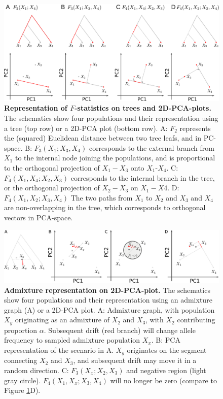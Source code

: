 \documentclass[12pt,fullpage, a4paper]{article}
\begin{document}
\begin{figure}[!ht]
	\includegraphics[width=\textwidth]{figures/fstats_pca_vs_tree.pdf}
	\caption{\textbf{Representation of $F$-statistics on trees and 2D-PCA-plots.} The schematics show four populations and their representation using a tree (top row) or a 2D-PCA plot (bottom row). A: $F_2$ represents the (squared) Euclidean distance between two tree leafs, and in PC-space. B: $F_3(X_1; X_3, X_4)$ corresponds to the external branch from $X_1$ to the internal node joining the populations, and is proportional to the orthogonal projection of $X_1 - X_3$ onto $X_1$-$X_4$. C: $F_4(X_1, X_4; X_2, X_3)$ corresponds to the internal branch in the tree, or the orthogonal projection of $X_2 - X_3$ on $X_1 - X4$. D: $F_4(X_1, X_2; X_3, X_4)$ The two paths from $X_1$ to $X_2$ and $X_3$ and $X_4$ are non-overlapping in the tree, which corresponds to orthogonal vectors in PCA-space.}
	\label{fig:geom}
\end{figure}

\begin{figure}[!ht]
	\includegraphics[width=\textwidth]{figures/fstats_admixture_pca.pdf}
	\caption{\textbf{Admixture representation on 2D-PCA-plot.} The schematics show four populations and their representation using an admixture graph (A) or a 2D-PCA plot. A: Admixture graph, with population $X_y$ originating as an admixture of $X_2$ and $X_3$, with $X_2$ contributing proportion $\alpha$. Subsequent drift (red branch) will change allele frequency to sampled admixture population $X_x$. B: PCA representation of the scenario in A. $X_y$ originates on the segment connecting $X_2$ and $X_3$, and subsequent drift may move it in a random direction. C: $F_3(X_x; X_2, X_3)$ and negative region (light gray circle). $F_4(X_1, X_x; X_3, X_4)$ will no longer be zero (compare to Figure \ref{fig:geom}D). }
	\label{fig:admix}
\end{figure}
\end{document}
